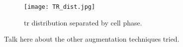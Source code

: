 \begin{figure}[htb]
  \centering
  \texttt{[image: TR\_dist.jpg]}
  \caption{\gls{tr} distribution separated by cell phase.}
  \label{fig:dataset:discus:tr_dist}
\end{figure}



Talk here about the other augmentation techniques tried.

